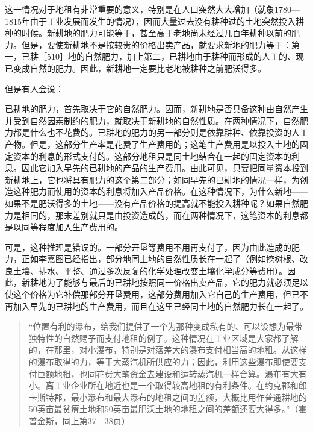 这一情况对于地租有非常重要的意义，特别是在人口突然大大增加（就象1780—1815年由于工业发展而发生的情况），因而大量过去没有耕种过的土地突然投入耕种的时候。新耕地的肥力可能等于，甚至高于老地尚未经过几百年耕种以前的肥力。但是，要使新耕地不是按较贵的价格出卖产品，就要求新地的肥力等于：第一，已耕［510］地的自然肥力，加上第二，已耕地由于耕种而形成的人工的、现已变成自然的肥力。因此，新耕地一定要比老地被耕种之前肥沃得多。

但是有人会说：

已耕地的肥力，首先取决于它的自然肥力。因而，新耕地是否具备这种由自然产生并受到自然因素制约的肥力，就取决于新耕地的自然性质。在两种情况下，自然肥力都是什么也不花费的。已耕地的肥力的另一部分则是依靠耕种、依靠投资的人工产物。但是，这部分生产率是花费了生产费用的；这笔生产费用是以投入土地的固定资本的利息的形式支付的。这部分地租只是同土地结合在一起的固定资本的利息。因此它加入早先的已耕地的产品的生产费用。由此可见，只要把同量资本投到新耕地上，它也将具有肥力的这个第二部分；如同早先的已耕地的情况一样，为创造这种肥力而使用的资本的利息将加入产品价格。在这种情况下，为什么新地——如果不是肥沃得多的土地——没有产品价格的提高就不能投入耕种呢？如果自然肥力是相同的，那末差别就只是由投资造成的，而在两种情况下，这笔资本的利息都是以同等程度加入生产费用的。

可是，这种推理是错误的。一部分开垦等费用不用再支付了，因为由此造成的肥力，正如李嘉图已经指出，部分地同土地的自然性质长在一起了（例如挖树根、改良土壤、排水、平整、通过多次反复的化学处理改变土壤化学成分等费用）。因此，新耕地为了能够与最后的已耕地按照同一价格出卖产品，它的肥力就必须足以使这个价格为它补偿那部分开垦费用，这部分费用加入它自己的生产费用，但已不再加入早先的已耕地的生产费用，而且在这里已经同土地的自然肥力长在一起了。

\begin{quote}{“位置有利的瀑布，给我们提供了一个为那种变成私有的、可以设想为最带独特性的自然赐予而支付地租的例子。这种情况在工业区域是大家都了解的，在那里，对小瀑布，特别是对落差大的瀑布支付相当高的地租。从这样的瀑布取得的力，等于大蒸汽机所供应的力；因此，利用这些瀑布即使要支付巨额地租，也同花费大笔资金去建设和运转蒸汽机一样合算。瀑布有大有小。离工业企业所在地近也是一个取得较高地租的有利条件。在约克郡和郎卡斯特郡，最小瀑布和最大瀑布的地租之间的差额，大概比用作普通耕地的50英亩最贫瘠土地和50英亩最肥沃土地的地租之间的差额还要大得多。”（霍普金斯，同上第37—38页）}\end{quote}


